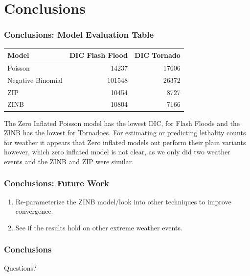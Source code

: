 \documentclass{beamer}
\begin{document}
	\section{Conclusions}
	\begin{frame}
		\frametitle{Conclusions: Model Evaluation Table}
\begin{table}
	\centering
	\label{t:evalresults}
	\begin{tabular}{lrr}
		\toprule
		Model & DIC Flash Flood & DIC Tornado\\
		\midrule
		Poisson & 14237 & 17606\\
		Negative Binomial & 101548 & 26372\\
		ZIP & 10454 & 8727 \\
		ZINB & 10804&7166\\
		\bottomrule
	\end{tabular}
\end{table}

The Zero Inflated Poisson model has the lowest DIC, for Flash Floods and the ZINB has the lowest for Tornadoes. For estimating or predicting lethality counts for weather it appears that Zero inflated models out perform their plain variants however, which zero inflated model is not clear, as we only did two weather events and the ZINB and ZIP were similar.
	\end{frame}
	\begin{frame}
	
		\frametitle{Conclusions: Future Work}
		\begin{enumerate}
			\item{Re-parameterize the ZINB model/look into other techniques to improve convergence.}
			\item{See if the results hold on other extreme weather events.}
		\end{enumerate}
	\end{frame}
	\begin{frame}
		\frametitle{Conclusions}
		Questions?
	\end{frame}
\end{document}

